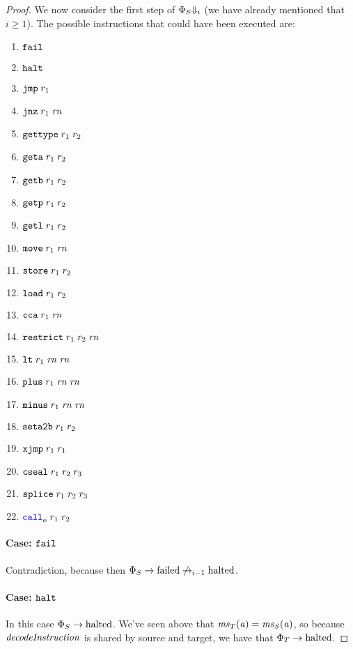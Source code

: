 \documentclass[a4paper]{article}
\begin{document}
\begin{proof}
We now consider the first step of $\Phi_S \term[i]$ (we have already mentioned that $i \geq 1$).
The possible instructions that could have been executed are:
\begin{enumerate}
\item $\tfail$
\item $\thalt$
\item $\tjmp{\trg{r_1}}$
\item $\tjnz{\trg{r_1}}{\trg{\rn}}$
\item $\tisptr{\trg{r_1}}{\trg{r_2}}$
\item $\tgeta{\trg{r_1}}{\trg{r_2}}$
\item $\tgetb{\trg{r_1}}{\trg{r_2}}$
\item $\tgetp{\trg{r_1}}{\trg{r_2}}$
\item $\tgetlin{\trg{r_1}}{\trg{r_2}}$
\item $\tmove{\trg{r_1}}{\trg{\rn}}$
\item $\tstore{\trg{r_1}}{\trg{r_2}}$
\item $\tload{\trg{r_1}}{\trg{r_2}}$
\item $\tcca{\trg{r_1}}{\trg{\rn}}$
\item $\trestrict{\trg{r_1}}{\trg{r_2}}{\trg{\rn}}$
\item $\tlt{\trg{r_1}}{\trg{\rn}}{\trg{\rn}}$
\item $\tplus{\trg{r_1}}{\trg{\rn}}{\trg{\rn}}$
\item $\tminus{\trg{r_1}}{\trg{\rn}}{\trg{\rn}}$
\item $\tsetatob{\trg{r_1}}{\trg{r_2}}$
\item $\txjmp{\trg{r_1}}{\trg{r_1}}$
\item $\tcseal{\trg{r_1}}{\trg{r_2}}{\trg{r_3}}$
\item $\tsplice{\trg{r_1}}{\trg{r_2}}{\trg{r_3}}$
\item $\scall[o]{}{r_1}{r_2}$
\end{enumerate}

\paragraph{Case: $\protect\tfail$}
Contradiction, because then $\Phi_S \step \failed \not\nstep[i-1] \halted$.

\paragraph{Case: $\protect\thalt$}
In this case $\Phi_S \step \halted$.
We've seen above that $\ms_T(\aaddr) = \ms_S(\aaddr)$, so because $\decInstr{}$ is shared by source and target, we have that $\Phi_T \step\halted$.


\end{proof}
\end{document}
